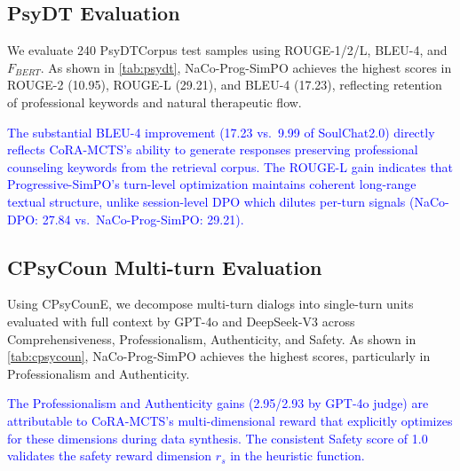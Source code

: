 \documentclass[lettersize,journal]{IEEEtran}
\newcommand{\blue}[1]{\textcolor{blue}{#1}}
\begin{document}
\subsection{PsyDT Evaluation}
We evaluate 240 PsyDTCorpus test samples using ROUGE-1/2/L, BLEU-4, and $F_{BERT}$. As shown in \cref{tab:psydt}, NaCo-Prog-SimPO achieves the highest scores in ROUGE-2 (10.95), ROUGE-L (29.21), and BLEU-4 (17.23), reflecting retention of professional keywords and natural therapeutic flow.

\blue{The substantial BLEU-4 improvement (17.23 vs.\ 9.99 of SoulChat2.0) directly reflects CoRA-MCTS's ability to generate responses preserving professional counseling keywords from the retrieval corpus. The ROUGE-L gain indicates that Progressive-SimPO's turn-level optimization maintains coherent long-range textual structure, unlike session-level DPO which dilutes per-turn signals (NaCo-DPO: 27.84 vs.\ NaCo-Prog-SimPO: 29.21).}

\subsection{CPsyCoun Multi-turn Evaluation}
Using CPsyCounE, we decompose multi-turn dialogs into single-turn units evaluated with full context by GPT-4o and DeepSeek-V3 across Comprehensiveness, Professionalism, Authenticity, and Safety. As shown in \cref{tab:cpsycoun}, NaCo-Prog-SimPO achieves the highest scores, particularly in Professionalism and Authenticity.

\blue{The Professionalism and Authenticity gains (2.95/2.93 by GPT-4o judge) are attributable to CoRA-MCTS's multi-dimensional reward that explicitly optimizes for these dimensions during data synthesis. The consistent Safety score of 1.0 validates the safety reward dimension $r_s$ in the heuristic function.}
\end{document}
